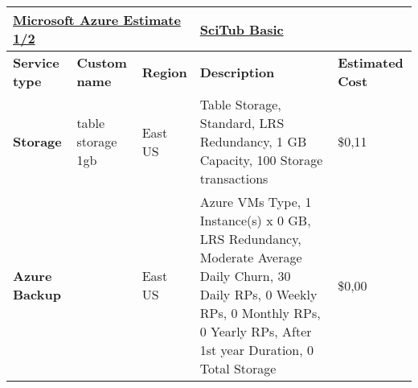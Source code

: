 %

\begin{landscape}
        \begin{table}[]
                \begin{tabularx}{\linewidth}{|l|X|X|X|X|}        %
                \hline
                \multicolumn{3}{|l|}{{\ul \textbf{Microsoft Azure Estimate 1/2}}}                     & {\ul \textbf{SciTub Basic}}                                                                                                                                                                                                                & {\ul \textbf{}}                          \\ \hline
                \textbf{Service type}             & \textbf{Custom name}      & \textbf{Region} & \textbf{Description}                                                                                                                                                                                                                             & \textbf{Estimated Cost}                  \\ \hline\hline
                \textbf{Storage}                  & table storage 1gb         & East US         & Table Storage, Standard, LRS Redundancy, 1 GB Capacity, 100 Storage transactions                                                                                                                                                                 & \$0,11                                   \\ \hline
                \textbf{Azure Backup}             &                           & East US         & Azure VMs Type, 1 Instance(s) x 0 GB, LRS Redundancy, Moderate Average Daily Churn, 30 Daily RPs, 0 Weekly RPs, 0 Monthly RPs, 0 Yearly RPs,  After 1st year Duration, 0 Total Storage                                                           & \$0,00                                   \\ \hline

\end{tabularx}
\end{table}
\end{landscape}
